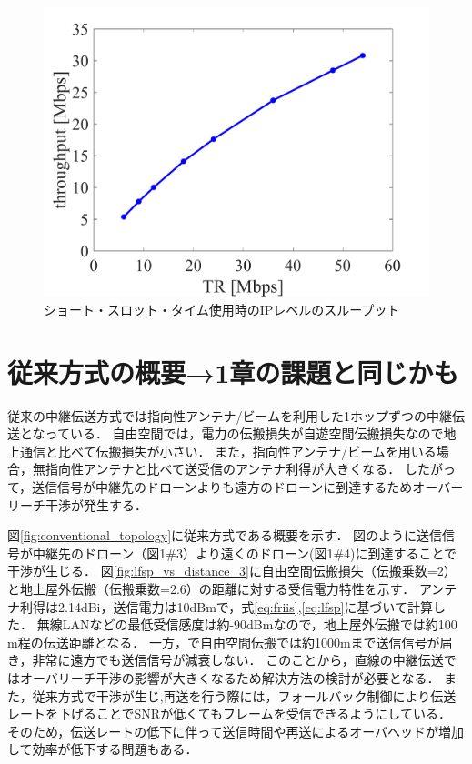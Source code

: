 \documentclass[a4paper,10.5pt]{ltjsarticle}
\begin{document}
\begin{figure}[H]
  \centering
  \includegraphics[width=\linewidth]{g_throughput.pdf} %
  \caption{ショート・スロット・タイム使用時のIPレベルのスループット}
  \label{fig:11g_throughput} %
\end{figure}


\clearpage
\section{従来方式の概要→1章の課題と同じかも}

従来の中継伝送方式では指向性アンテナ/ビームを利用した1ホップずつの中継伝送となっている．
自由空間では，電力の伝搬損失が自遊空間伝搬損失なので地上通信と比べて伝搬損失が小さい．
また，指向性アンテナ/ビームを用いる場合，無指向性アンテナと比べて送受信のアンテナ利得が大きくなる．
したがって，送信信号が中継先のドローンよりも遠方のドローンに到達するためオーバーリーチ干渉が発生する．\par
図\ref{fig:conventional_topology}に従来方式である概要を示す．
図のように送信信号が中継先のドローン（図1\#3）より遠くのドローン(図1\#4)に到達することで干渉が生じる．
図\ref{fig:lfsp_vs_distance_3}に自由空間伝搬損失（伝搬乗数=2）と地上屋外伝搬（伝搬乗数=2.6）の距離に対する受信電力特性を示す．
アンテナ利得は2.14dBi，送信電力は10dBmで，式\ref{eq:friis},\ref{eq:lfsp}に基づいて計算した．
無線LANなどの最低受信感度は約-90dBmなので，地上屋外伝搬では約100 m程の伝送距離となる．
一方，で自由空間伝搬では約1000mまで送信信号が届き，非常に遠方でも送信信号が減衰しない．
このことから，直線の中継伝送ではオーバリーチ干渉の影響が大きくなるため解決方法の検討が必要となる．
また，従来方式で干渉が生じ,再送を行う際には，フォールバック制御により伝送レートを下げることでSNRが低くてもフレームを受信できるようにしている．
そのため，伝送レートの低下に伴って送信時間や再送によるオーバヘッドが増加して効率が低下する問題もある．
\end{document}
